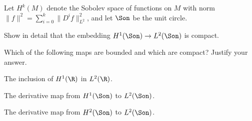 Let $H^k(M)$ denote the Sobolev space of functions on $M$ with norm
$\|f\|^2=\sum_{i=0}^k\|D^if\|^2_{L^2}$, and let $\Son$ be the unit
circle.
\begin{alist}
\item Show in detail that the embedding $H^1(\Son)\rightarrow
L^2(\Son)$ is compact.
\item Which of the following maps are bounded and which are compact?
Justify your answer.
\begin{rlist}
\item The inclusion of $H^1(\R)$ in $L^2(\R)$.
\item The derivative map from $H^1(\Son)$ to $L^2(\Son)$.
\item The derivative map from $H^2(\Son)$ to $L^2(\Son)$.
\end{rlist}
\end{alist}
